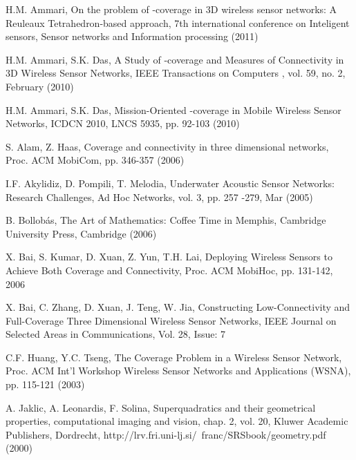 \documentclass[conference]{IEEEtran}
\begin{document}


\begin{thebibliography}{99}


H.M. Ammari, On the problem of -coverage in 3D wireless sensor networks: A Reuleaux Tetrahedron-based approach, 7th international conference on Inteligent sensors, Sensor networks and Information processing (2011)



H.M. Ammari, S.K. Das, A Study of -coverage and Measures of Connectivity in 3D Wireless Sensor Networks, IEEE Transactions on Computers , vol. 59, no. 2, February (2010)



H.M. Ammari, S.K. Das, Mission-Oriented -coverage in Mobile Wireless Sensor Networks, ICDCN 2010, LNCS 5935, pp. 92-103 (2010)


S. Alam, Z. Haas, Coverage and connectivity in three dimensional networks, Proc. ACM MobiCom, pp. 346-357 (2006)


I.F. Akylidiz, D. Pompili, T. Melodia, Underwater Acoustic Sensor Networks: Research Challenges, Ad Hoc Networks, vol. 3, pp. 257
-279, Mar (2005)


B. Bollobás, The Art of Mathematics: Coffee Time in Memphis, Cambridge University Press, Cambridge (2006)


X. Bai, S. Kumar, D. Xuan, Z. Yun, T.H. Lai, Deploying Wireless Sensors to Achieve Both Coverage and Connectivity, Proc. ACM MobiHoc, pp. 131-142, 2006


X. Bai, C. Zhang, D. Xuan, J. Teng, W. Jia, Constructing Low-Connectivity and Full-Coverage Three Dimensional Wireless Sensor Networks, IEEE Journal on Selected Areas in Communications, Vol. 28, Issue: 7  


C.F. Huang, Y.C. Tseng, The Coverage Problem in a Wireless Sensor Network, Proc. ACM Int’l Workshop Wireless Sensor Networks and Applications (WSNA), pp. 115-121 (2003)


A. Jaklic, A. Leonardis, F. Solina, Superquadratics and their geometrical properties, computational imaging and vision, chap. 2, vol. 20, Kluwer Academic Publishers, Dordrecht, http://lrv.fri.uni-lj.si/~franc/SRSbook/geometry.pdf (2000)


\end{thebibliography}
\end{document}
